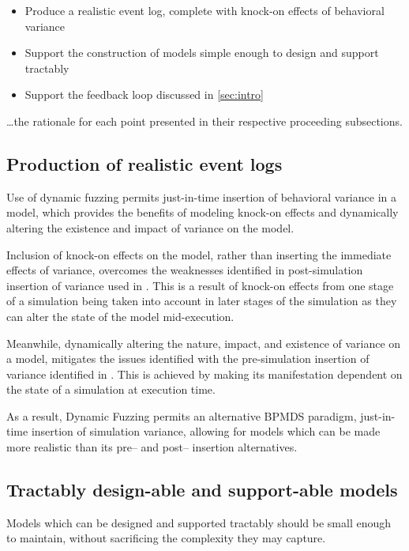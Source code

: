 \documentclass[12pt]{llncs}  %
\begin{document}
\begin{itemize}
\item Produce a realistic event log, complete with knock-on effects of
  behavioral variance
\item Support the construction of models simple enough to design and support
  tractably
\item Support the feedback loop discussed in \cref{sec:intro}
\end{itemize}

\ldots{}the rationale for each point presented in their respective proceeding
subsections.

\subsection{Production of realistic event logs}
Use of dynamic fuzzing permits just-in-time insertion of behavioral variance in
a model, which provides the benefits of modeling knock-on effects and
dynamically altering the existence and impact of variance on the model.
\par

Inclusion of knock-on effects on the model, rather than inserting the immediate
effects of variance, overcomes the weaknesses identified in post-simulation
insertion of variance used in \cite{accorsi2013secsy}. This is a result of
knock-on effects from one stage of a simulation being taken into account in
later stages of the simulation as they can alter the state of the model
mid-execution.
\par

Meanwhile, dynamically altering the nature, impact, and existence of variance on
a model, mitigates the issues identified with the pre-simulation insertion of
variance identified in \cite{pourmasoumi2015business}. This is achieved by making its
manifestation dependent on the state of a simulation at execution time.
\par

As a result, Dynamic Fuzzing permits an alternative BPMDS paradigm, just-in-time
insertion of simulation variance, allowing for models which can be made more
realistic than its pre-- and post-- insertion alternatives.
\par


\subsection{Tractably design-able and support-able models}
Models which can be designed and supported tractably should be small enough to
maintain, without sacrificing the complexity they may capture.
\par
\end{document}
